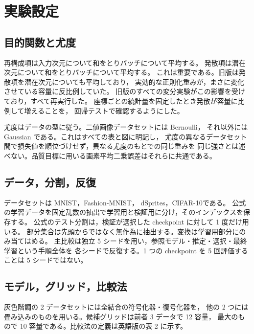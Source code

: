 \documentclass[11pt,a4paper]{jsarticle}
\begin{document}
\section{実験設定}\label{sec:setup}

\subsection{目的関数と尤度}\label{sec:setup_loss}

再構成項は入力次元について和をとりバッチについて平均する。
発散項は潜在次元について和をとりバッチについて平均する\cite{higgins2017betavae}。
これは重要である。旧版は発散項を潜在次元についても平均しており，
実効的な正則化重みが，まさに変化させている容量に反比例していた。
旧版のすべての変分実験がこの影響を受けており，すべて再実行した。
座標ごとの統計量を固定したとき発散が容量に比例して増えることを，
回帰テストで確認するようにした。

尤度はデータの型に従う。二値画像データセット\cite{matthey2017dsprites}には Bernoulli，
それ以外には Gaussian である。これはすべての表と図に明記し，
尤度の異なるデータセット間で損失値を順位づけせず，異なる尤度のもとでの同じ重みを
同じ強さとは述べない。品質目標に用いる画素平均二乗誤差はそれらに共通である。

\subsection{データ，分割，反復}\label{sec:setup_data}

データセットは MNIST\cite{lecun1998}，Fashion-MNIST\cite{xiao2017fashion}，
dSprites\cite{matthey2017dsprites}，CIFAR-10\cite{krizhevsky2009learning}である。
公式の学習データを固定乱数の抽出で学習用と検証用に分け，そのインデックスを保存する。
公式のテスト分割は，検証が選択した checkpoint に対して 1 度だけ用いる。
部分集合は先頭からではなく無作為に抽出する。変換は学習用部分にのみ当てはめる。
主比較は独立 5 シードを用い，参照モデル・推定・選択・最終学習という手順全体を
各シードで反復する。1 つの checkpoint を 5 回評価することは 5 シードではない。

\subsection{モデル，グリッド，比較法}\label{sec:setup_methods}

灰色階調の 2 データセットには全結合の符号化器・復号化器を，
他の 2 つには畳み込みのものを用いる。候補グリッドは前者 3 データで 12 容量，
最大のもので 10 容量である。比較法の定義は英語版の表 2 に示す。
\end{document}
